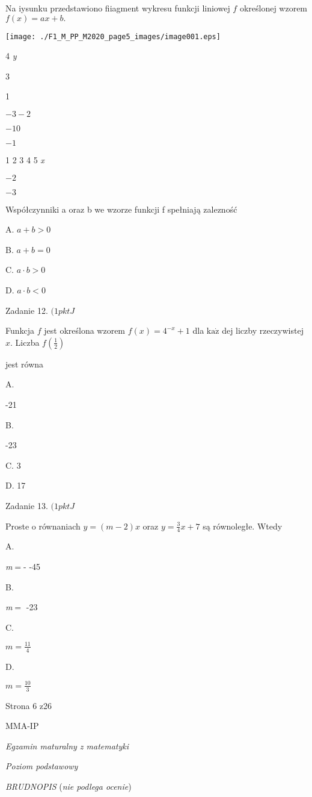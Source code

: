 \documentclass[a4paper,12pt]{article}
\begin{document}
Na iysunku przedstawiono fiiagment wykresu funkcji liniowej $f$ określonej wzorem $f(x)=ax+b.$
\begin{center}
\texttt{[image: ./F1\_M\_PP\_M2020\_page5\_images/image001.eps]}
\end{center}
4  {\it y}

3

1

$-3 -2$

$-1 0$

$-1$

1 2 3 4  5  {\it x}

$-2$

$-3$

Współczynniki a oraz b we wzorze funkcji f spełniają zalezność

A. $a+b>0$

B. $a+b=0$

C. $a\cdot b>0$

D. $a\cdot b<0$

Zadanie 12. $(1pktJ$

Funkcja $f$ jest określona wzorem $f(x)=4^{-x}+1$ dla $\mathrm{k}\mathrm{a}\dot{\mathrm{z}}$ dej liczby rzeczywistej $x$. Liczba $f(\displaystyle \frac{1}{2})$

jest równa

A.

-21

B.

-23

C. 3

D. 17

Zadanie 13. $(1pktJ$

Proste o równaniach $y=(m-2)x$ oraz $y=\displaystyle \frac{3}{4}x+7$ są równoległe. Wtedy

A.

{\it m}$=$- -45

B.

{\it m}$=$ -23

C.

$m=\displaystyle \frac{11}{4}$

D.

$m=\displaystyle \frac{10}{3}$

Strona 6 z26

MMA-IP





{\it Egzamin maturalny z matematyki}

{\it Poziom podstawowy}

{\it BRUDNOPIS} ({\it nie podlega ocenie})
\end{document}
